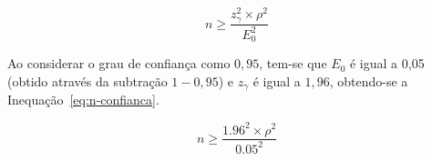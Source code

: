 \begin{apendicesenv}
\begin{equation}
n \geq \frac{z_\gamma^2 \times \rho^2}{E_0^2}
\label{eq:n-puro}
\end{equation} 

Ao considerar o grau de confiança como $0,95$, tem-se que $E_0$ é igual a 0,05 (obtido através da subtração $1 - 0,95$) e $z_\gamma$ é igual a $1,96$, obtendo-se a Inequação~\ref{eq:n-confianca}. 

\begin{equation}
n \geq \frac{1.96^2 \times \rho^2}{0.05^2}
\label{eq:n-confianca}
\end{equation} 



\end{apendicesenv}



